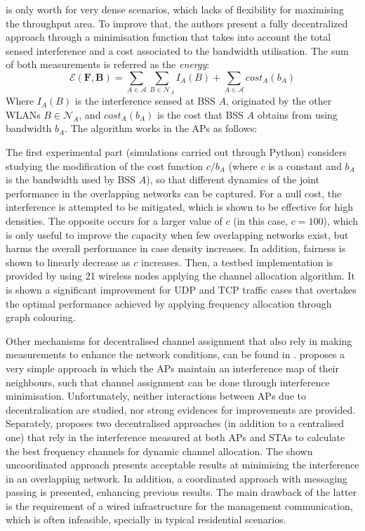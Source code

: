\documentclass[12pt, a4paper,twoside]{tesi_upf}
\begin{document}
is only worth for very dense scenarios, which lacks of flexibility for maximising the throughput area. To improve that, the authors present a fully decentralized approach through a minimisation function that takes into account the total sensed interference and a cost associated to the bandwidth utilisation. The sum of both measurements is referred as the \textit{energy}:
			\begin{equation}
			\mathcal{E} (\textbf{F},\textbf{B}) = \sum_{A \in \mathcal{A}} \sum_{B \in \mathcal{N}_A} I_A (B) + \sum_{A \in \mathcal{A}} cost_A (b_A)
			\end{equation}
			Where $I_A (B)$ is the interference sensed at BSS $A$, originated by the other WLANs $B \in \mathcal{N}_A$, and $cost_A (b_A)$ is the cost that BSS $A$ obtains from using bandwidth $b_A$. The algorithm works in the APs as follows:
			\begin{figure}[h!]
				\centering
				\label{fig:saw_alg}
			\end{figure}	
			The first experimental part (simulations carried out through Python) considers studying the modification of the cost function $c/b_A$ (where $c$ is a constant and $b_A$ is the bandwidth used by BSS $A$), so that different dynamics of the joint performance in the overlapping networks can be captured. For a null cost, the interference is attempted to be mitigated, which is shown to be effective for high densities. The opposite occurs for a larger value of $c$ (in this case, $c=100$), which is only useful to improve the capacity when few overlapping networks exist, but harms the overall performance in case density increases. In addition, fairness is shown to linearly decrease as $c$ increases. Then, a testbed implementation is provided by using 21 wireless nodes applying the channel allocation algorithm. It is shown a significant improvement for UDP and TCP traffic cases that overtakes the optimal performance achieved by applying frequency allocation through graph colouring.
								
			Other mechanisms for decentralised channel assignment that also rely in making measurements to enhance the network conditions, can be found in \cite{akl2007dynamic, chen2007improved}. \cite{akl2007dynamic} proposes a very simple approach in which the APs maintain an interference map of their neighbours, such that channel assignment can be done through interference minimisation. Unfortunately, neither interactions between APs due to decentralisation are studied, nor strong evidences for improvements are provided. Separately, \cite{chen2007improved} proposes two decentralised approaches (in addition to a centralised one) that rely in the interference measured at both APs and STAs to calculate the best frequency channels for dynamic channel allocation. The shown uncoordinated approach presents acceptable results at minimising the interference in an overlapping network. In addition, a coordinated approach with messaging passing is presented, enhancing previous results. The main drawback of the latter is the requirement of a wired infrastructure for the management communication, which is often infeasible, specially in typical residential scenarios. 				
			
\end{document}

